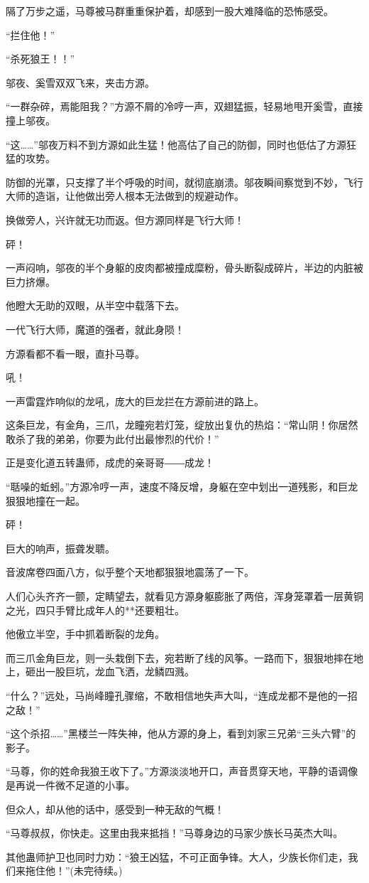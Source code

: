 \begin{this_body}
隔了万步之遥，马尊被马群重重保护着，却感到一股大难降临的恐怖感受。

“拦住他！”

“杀死狼王！！”

邬夜、奚雪双双飞来，夹击方源。

“一群杂碎，焉能阻我？”方源不屑的冷哼一声，双翅猛振，轻易地甩开奚雪，直接撞上邬夜。

“这……”邬夜万料不到方源如此生猛！他高估了自己的防御，同时也低估了方源狂猛的攻势。

防御的光罩，只支撑了半个呼吸的时间，就彻底崩溃。邬夜瞬间察觉到不妙，飞行大师的造诣，让他做出旁人根本无法做到的规避动作。

换做旁人，兴许就无功而返。但方源同样是飞行大师！

砰！

一声闷响，邬夜的半个身躯的皮肉都被撞成糜粉，骨头断裂成碎片，半边的内脏被巨力挤爆。

他瞪大无助的双眼，从半空中载落下去。

一代飞行大师，魔道的强者，就此身陨！

方源看都不看一眼，直扑马尊。

吼！

一声雷霆炸响似的龙吼，庞大的巨龙拦在方源前进的路上。

这条巨龙，有金角，三爪，龙瞳宛若灯笼，绽放出复仇的热焰：“常山阴！你居然敢杀了我的弟弟，你要为此付出最惨烈的代价！”

正是变化道五转蛊师，成虎的亲哥哥――成龙！

“聒噪的蚯蚓。”方源冷哼一声，速度不降反增，身躯在空中划出一道残影，和巨龙狠狠地撞在一起。

砰！

巨大的响声，振聋发聩。

音波席卷四面八方，似乎整个天地都狠狠地震荡了一下。

人们心头齐齐一颤，定睛望去，就看见方源身躯膨胀了两倍，浑身笼罩着一层黄铜之光，四只手臂比成年人的**还要粗壮。

他傲立半空，手中抓着断裂的龙角。

而三爪金角巨龙，则一头栽倒下去，宛若断了线的风筝。一路而下，狠狠地摔在地上，砸出一股巨坑，龙血飞洒，龙鳞四溅。

“什么？”远处，马尚峰瞳孔骤缩，不敢相信地失声大叫，“连成龙都不是他的一招之敌！”

“这个杀招……”黑楼兰一阵失神，他从方源的身上，看到刘家三兄弟“三头六臂”的影子。

“马尊，你的姓命我狼王收下了。”方源淡淡地开口，声音贯穿天地，平静的语调像是再说一件微不足道的小事。

但众人，却从他的话中，感受到一种无敌的气概！

“马尊叔叔，你快走。这里由我来抵挡！”马尊身边的马家少族长马英杰大叫。

其他蛊师护卫也同时力劝：“狼王凶猛，不可正面争锋。大人，少族长你们走，我们来拖住他！”(未完待续。)

\end{this_body}

